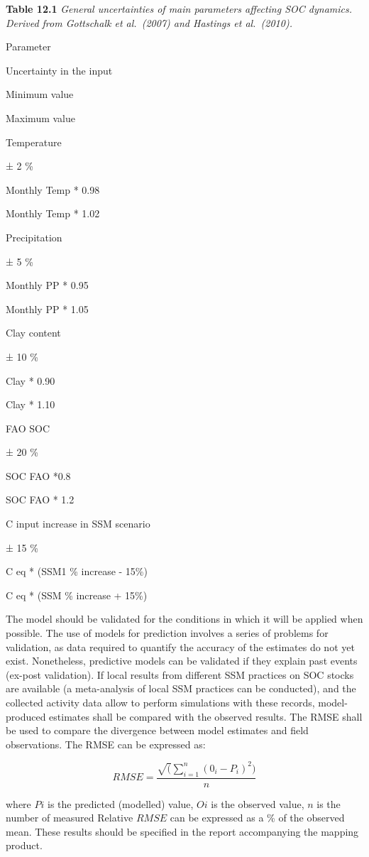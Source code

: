 \documentclass[
  10pt,
  b5paper,
]{book}
\begin{document}
\textbf{Table 12.1} \emph{General uncertainties of main parameters affecting SOC dynamics. Derived from Gottschalk et al.~(2007) and Hastings et al.~(2010).}

Parameter

Uncertainty in the input

Minimum value

Maximum value

Temperature

± 2 \%

Monthly Temp * 0.98

Monthly Temp * 1.02

Precipitation

± 5 \%

Monthly PP * 0.95

Monthly PP * 1.05

Clay content

± 10 \%

Clay * 0.90

Clay * 1.10

FAO SOC

± 20 \%

SOC FAO *0.8

SOC FAO * 1.2

C input increase in SSM scenario

± 15 \%

C eq * (SSM1 \% increase - 15\%)

C eq * (SSM \% increase + 15\%)

The model should be validated for the conditions in which it will be applied when possible. The use of models for prediction involves a series of problems for validation, as data required to quantify the accuracy of the estimates do not yet exist. Nonetheless, predictive models can be validated if they explain past events (ex-post validation). If local results from different SSM practices on SOC stocks are available (a meta-analysis of local SSM practices can be conducted), and the collected activity data allow to perform simulations with these records, model-produced estimates shall be compared with the observed results. The RMSE shall be used to compare the divergence between model estimates and field observations. The RMSE can be expressed as:

\begin{equation}
\tag{12.8}
RMSE = \frac{\sqrt(\sum_{i=1}^n (0_i - P_i)^2)}{n}
\end{equation}

where \(Pi\) is the predicted (modelled) value, \(Oi\) is the observed value, \(n\) is the number of measured
Relative \(RMSE\) can be expressed as a \% of the observed mean. These results should be specified in the report accompanying the mapping product.
\end{document}
